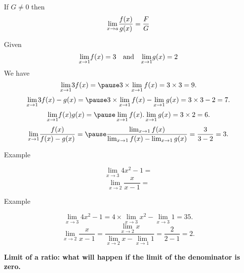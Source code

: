 \documentclass{beamer}
\begin{document}
\begin{frame}
\begin{tcolorbox}[width=\textwidth,colback={blue!10},title={},colbacktitle=yellow,coltitle=blue] 

			 If $G\neq 0$ then $$\underset{x\rightarrow a}{\rm lim}\frac{f(x)}{g(x)}=\frac{F}{G}$$

\end{tcolorbox}
\end{frame}
\begin{frame}
\begin{tcolorbox}[width=\textwidth,colback={green!10},title={},colbacktitle=yellow,coltitle=blue] 
\begin{Example}
	Given 
	$$\underset{x\rightarrow 1}{\rm lim}f(x)=3\quad \text{and} \quad \underset{x\rightarrow 1}{\rm lim}g(x)=2 $$
	We have 
	$$\underset{x\rightarrow 1}{\rm lim}3f(x)=\pause 3\times \lim_{x\to 1}f(x)=3\times 3=9.$$
	$$\underset{x\rightarrow 1}{\rm lim}3f(x)-g(x)=\pause 3\times \lim_{x\to 1}f(x)-\lim_{x\to 1}g(x)=3\times 3- 2=7.$$
	$$\underset{x\rightarrow 1}{\rm lim}f(x)g(x)=\pause \lim_{x\to 1}f(x).\lim_{x\to 1}g(x)=3\times 2=6.$$
	$$\underset{x\rightarrow 1}{\rm lim} \frac{f(x)}{f(x)-g(x)}=\pause \frac{\lim_{x\to 1}f(x)}{\lim_{x\to 1}f(x)-\lim_{x\to 1}g(x)}=\frac{3}{3-2}=3.$$
\end{Example}
\end{tcolorbox}
\end{frame}
\begin{frame}{Example}

$$\lim_{x\to 3}4x^2-1=$$
$$\lim_{x\to 2}\frac{x}{x-1}=$$

\end{frame}
\begin{frame}{Example}

$$\lim_{x\to 3}4x^2-1=4\times \lim_{x\to 3}x^2-\lim_{x\to 3}1=35.$$
$$\lim_{x\to 2}\frac{x}{x-1}=\frac{\lim_{x\to 2}x}{\lim_{x\to 2}x-\lim_{x\to 1}1}=\frac{2}{2-1}=2.$$

\end{frame}

\begin{frame}
\begin{center}
	{\bf \Large \color{blue} Limit of a ratio: what will happen if the limit of the denominator is zero.}
\end{center}
\end{frame}
\end{document}
